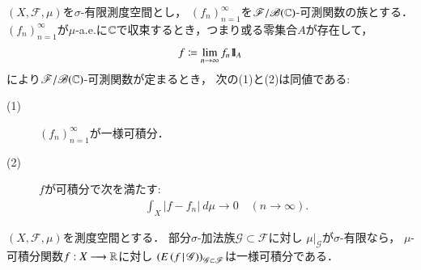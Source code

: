 	\begin{screen}
	\begin{thm}[一様可積分性と平均収束]\label{lem:uniformly_integrable_and_convergence_in_mean}
		$(X,\mathscr{F},\mu)$を$\sigma$-有限測度空間とし，
		$(f_n)_{n=1}^\infty$を$\mathscr{F}/\mathscr{B}(\mathbb{C})$-可測関数の族とする．
		$(f_n)_{n=1}^\infty$が$\mu$-a.e.に$\mathbb{C}$で収束するとき，つまり或る零集合$A$が存在して，
		\begin{align}
			f \coloneqq \lim_{n \to \infty} f_n \mbox{1}\hspace{-0.25em}\mbox{l}_A
		\end{align}
		により$\mathscr{F}/\mathscr{B}(\mathbb{C})$-可測関数が定まるとき，
		次の(1)と(2)は同値である:
		\begin{description}
			\item[(1)] $(f_n)_{n=1}^\infty$が一様可積分．
			\item[(2)] $f$が可積分で次を満たす:
				\begin{align}
					\int_X |f - f_n|\ d\mu 
					\longrightarrow 0
					\quad (n \longrightarrow \infty).
				\end{align}
		\end{description}
	\end{thm}
	\end{screen}
	
	\begin{screen}
	\begin{thm}[一様可積分性と条件付き期待値]\label{lem:uniformly_integrability_and_conditional_expectations}
		$(X,\mathscr{F},\mu)$を測度空間とする．
		部分$\sigma$-加法族$\mathscr{G} \subset \mathscr{F}$に対し
		$\left. \mu \right|_{\mathscr{G}}$が$\sigma$-有限なら，
		$\mu$-可積分関数$f:X \longrightarrow \mathbb{R}$に対し
		$\left( E\left( f \, \middle|\, \mathscr{G} \right) \right)_{\mathscr{G} \subset \mathscr{F}}$は一様可積分である．
	\end{thm}
	\end{screen}
	
